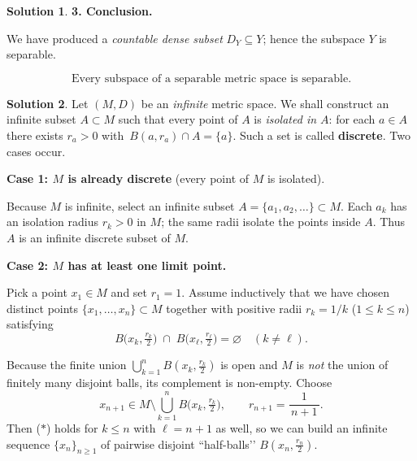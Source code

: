 \documentclass[12pt]{article}
\theoremstyle{definition} %
\newtheorem{solution}{Solution}
\theoremstyle{plain} %
\begin{document}
\begin{solution}
            \bigskip
            \textbf{3.  Conclusion.}
            
            We have produced a \emph{countable dense subset} \(D_Y\subseteq Y\);
            hence the subspace \(Y\) is separable.
            
            \[
               \boxed{\text{Every subspace of a separable metric space is separable.}}
            \]
            \end{solution}
            \begin{solution}
                  Let \((M,D)\) be an \emph{infinite} metric space.  
                  We shall construct an infinite subset \(A\subset M\) such that every
                  point of \(A\) is \emph{isolated in \(A\)}: for each \(a\in A\) there
                  exists \(r_{a}>0\) with 
                  \(\,B(a,r_{a})\cap A=\{a\}\).
                  Such a set is called \textbf{discrete}.  
                  Two cases occur.
                  
                  \medskip
                  \textbf{Case 1: \(M\) is already discrete}  
                  (every point of \(M\) is isolated).
                  
                  Because \(M\) is infinite, select an infinite subset
                  \(A=\{a_{1},a_{2},\dots\}\subset M\).
                  Each \(a_{k}\) has an isolation radius \(r_{k}>0\) in \(M\);
                  the same radii isolate the points inside \(A\).
                  Thus \(A\) is an infinite discrete subset of \(M\).
                  
                  \medskip
                  \textbf{Case 2: \(M\) has at least one limit point.}
                  
                  Pick a point \(x_{1}\in M\) and set \(r_{1}=1\).
                  Assume inductively that we have chosen distinct points
                  \(\{x_{1},\dots,x_{n}\}\subset M\) together with positive radii
                  \(r_{k}=1/k\) (\(1\le k\le n\)) satisfying
                  \[
                     B\!\bigl(x_{k},\tfrac{r_{k}}{2}\bigr)
                     \;\cap\;
                     B\!\bigl(x_{\ell},\tfrac{r_{\ell}}{2}\bigr)
                     =\varnothing
                     \quad(k\ne\ell).
                  \tag{$\ast$}
                  \]
                  
                  Because the finite union
                  \(\bigcup_{k=1}^{n} B(x_{k},\tfrac{r_{k}}{2})\) is open and \(M\) is
                  \emph{not} the union of finitely many disjoint balls,
                  its complement is non-empty.  
                  Choose
                  \[
                     x_{n+1}\in M\setminus\bigcup_{k=1}^{n}
                                  B\!\bigl(x_{k},\tfrac{r_{k}}{2}\bigr),
                     \qquad
                     r_{n+1}=\frac1{\,n+1\,}.
                  \]
                  Then (\(\ast\)) holds for \(k\le n\) with \(\ell=n+1\) as well, so we
                  can build an infinite sequence \(\{x_{n}\}_{n\ge1}\) of pairwise
                  disjoint “half-balls’’
                  \(B(x_{n},\tfrac{r_{n}}{2})\).
                  

\end{solution}
\end{document}
